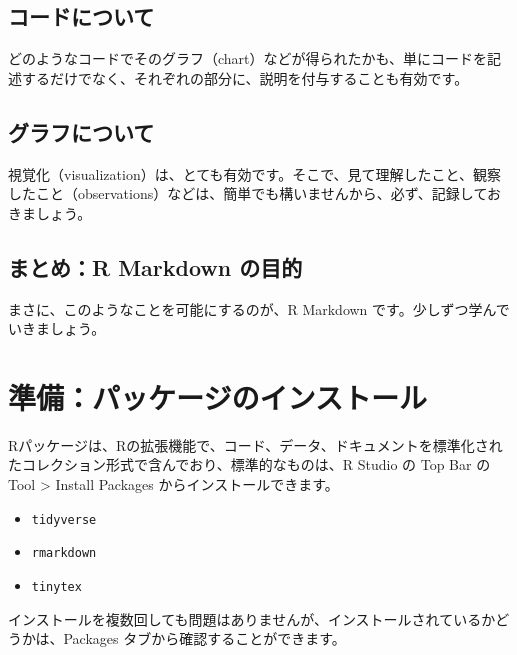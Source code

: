 \documentclass[
  xelatex, ja=standard]{bxjsbook}
\providecommand{\tightlist}{%
  \setlength{\itemsep}{0pt}\setlength{\parskip}{0pt}}
\theoremstyle{definition}
\theoremstyle{definition}
\theoremstyle{definition}
\theoremstyle{definition}
\theoremstyle{remark}
\begin{document}
\hypertarget{ux30b3ux30fcux30c9ux306bux3064ux3044ux3066}{%
\subsection{コードについて}\label{ux30b3ux30fcux30c9ux306bux3064ux3044ux3066}}

どのようなコードでそのグラフ（chart）などが得られたかも、単にコードを記述するだけでなく、それぞれの部分に、説明を付与することも有効です。

\hypertarget{ux30b0ux30e9ux30d5ux306bux3064ux3044ux3066}{%
\subsection{グラフについて}\label{ux30b0ux30e9ux30d5ux306bux3064ux3044ux3066}}

視覚化（visualization）は、とても有効です。そこで、見て理解したこと、観察したこと（observations）などは、簡単でも構いませんから、必ず、記録しておきましょう。

\hypertarget{ux307eux3068ux3081r-markdown-ux306eux76eeux7684}{%
\subsection{まとめ：R Markdown の目的}\label{ux307eux3068ux3081r-markdown-ux306eux76eeux7684}}

まさに、このようなことを可能にするのが、R Markdown です。少しずつ学んでいきましょう。

\hypertarget{ux6e96ux5099ux30d1ux30c3ux30b1ux30fcux30b8ux306eux30a4ux30f3ux30b9ux30c8ux30fcux30eb}{%
\section{準備：パッケージのインストール}\label{ux6e96ux5099ux30d1ux30c3ux30b1ux30fcux30b8ux306eux30a4ux30f3ux30b9ux30c8ux30fcux30eb}}

Rパッケージは、Rの拡張機能で、コード、データ、ドキュメントを標準化されたコレクション形式で含んでおり、標準的なものは、R Studio の Top Bar の Tool \textgreater{} Install Packages からインストールできます。

\begin{itemize}
\tightlist
\item
  \texttt{tidyverse}
\item
  \texttt{rmarkdown}
\item
  \texttt{tinytex}
\end{itemize}

インストールを複数回しても問題はありませんが、インストールされているかどうかは、Packages タブから確認することができます。
\end{document}
